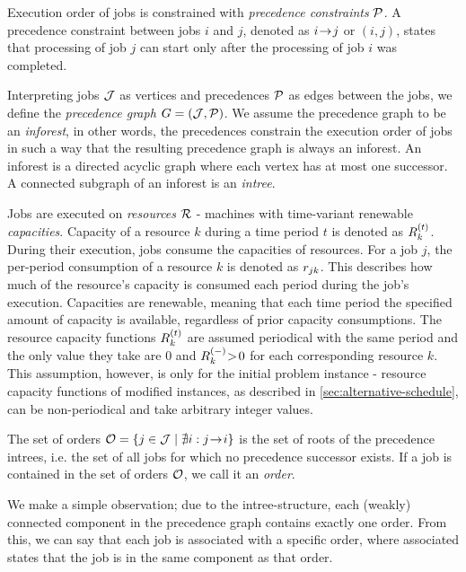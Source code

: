 Execution order of jobs is constrained with \emph{precedence constraints} $\mathcal{P}$.
A precedence constraint between jobs $i$ and $j$, denoted as $i \hspace{-0.2em} \rightarrow \hspace{-0.2em} j$ or $(i, j)$,
states that processing of job $j$ can start only after the processing of job $i$ was completed.

Interpreting jobs $\mathcal{J}$ as vertices and precedences $\mathcal{P}$ as edges between the jobs,
we define the \emph{precedence graph} $G = (\mathcal{J}, \mathcal{P})$.
We assume the precedence graph to be an \emph{inforest}, in other words,
the precedences constrain the execution order of jobs in such a way that the resulting precedence graph
is always an inforest.
An inforest is a directed acyclic graph where each vertex has at most one successor.
A connected subgraph of an inforest is an \emph{intree}.

Jobs are executed on \emph{resources} $\mathcal{R}$ - machines with time-variant renewable \emph{capacities}.
Capacity of a resource $k$ during a time period $t$ is denoted as $\capacity{k}{t}$.
During their execution, jobs consume the capacities of resources.
For a job $j$, the per-period consumption of a resource $k$ is denoted as $r_{j k}$.
This describes how much of the resource's capacity is consumed each period during the job's execution.
Capacities are renewable, meaning that each time period the specified amount of capacity is available,
regardless of prior capacity consumptions.
The resource capacity functions $\capacity{k}{t}$ are assumed periodical with the same period
and the only value they take are $0$ and $\shiftcapacity{k} \negmedspace>\! 0$ for each corresponding resource $k$.
This assumption, however, is only for the initial problem instance
- resource capacity functions of modified instances, as described in \cref{sec:alternative-schedule},
can be non-periodical and take arbitrary integer values.

The set of orders $\mathcal{O} = \{ j \in \mathcal{J} \mid \nexists i : j \hspace{-0.2em} \rightarrow \hspace{-0.2em} i \}$
is the set of roots of the precedence intrees,
i.e. the set of all jobs for which no precedence successor exists.
If a job is contained in the set of orders $\mathcal{O}$, we call it an \emph{order}.

We make a simple observation; due to the intree-structure,
each (weakly) connected component in the precedence graph contains exactly one order.
From this, we can say that each job is associated with a specific order,
where associated states that the job is in the same component as that order.

